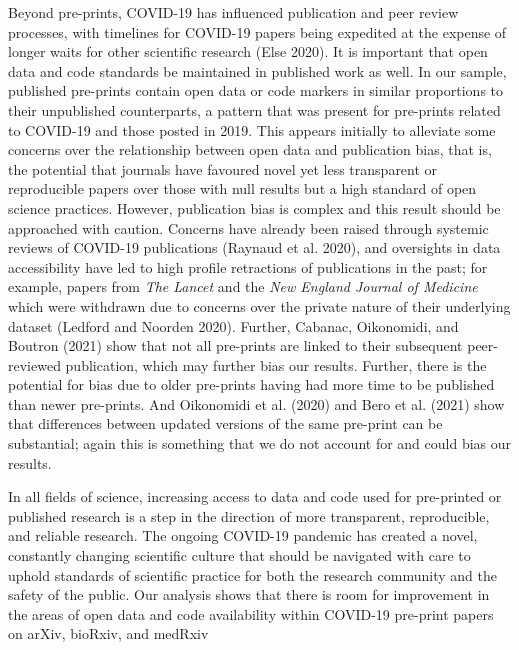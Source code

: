 \documentclass[
]{article}
\begin{document}
Beyond pre-prints, COVID-19 has influenced publication and peer review processes, with timelines for COVID-19 papers being expedited at the expense of longer waits for other scientific research (Else 2020). It is important that open data and code standards be maintained in published work as well. In our sample, published pre-prints contain open data or code markers in similar proportions to their unpublished counterparts, a pattern that was present for pre-prints related to COVID-19 and those posted in 2019. This appears initially to alleviate some concerns over the relationship between open data and publication bias, that is, the potential that journals have favoured novel yet less transparent or reproducible papers over those with null results but a high standard of open science practices. However, publication bias is complex and this result should be approached with caution. Concerns have already been raised through systemic reviews of COVID-19 publications (Raynaud et al. 2020), and oversights in data accessibility have led to high profile retractions of publications in the past; for example, papers from \emph{The Lancet} and the \emph{New England Journal of Medicine} which were withdrawn due to concerns over the private nature of their underlying dataset (Ledford and Noorden 2020). Further, Cabanac, Oikonomidi, and Boutron (2021) show that not all pre-prints are linked to their subsequent peer-reviewed publication, which may further bias our results. Further, there is the potential for bias due to older pre-prints having had more time to be published than newer pre-prints. And Oikonomidi et al. (2020) and Bero et al. (2021) show that differences between updated versions of the same pre-print can be substantial; again this is something that we do not account for and could bias our results.

In all fields of science, increasing access to data and code used for pre-printed or published research is a step in the direction of more transparent, reproducible, and reliable research. The ongoing COVID-19 pandemic has created a novel, constantly changing scientific culture that should be navigated with care to uphold standards of scientific practice for both the research community and the safety of the public. Our analysis shows that there is room for improvement in the areas of open data and code availability within COVID-19 pre-print papers on arXiv, bioRxiv, and medRxiv
\end{document}
